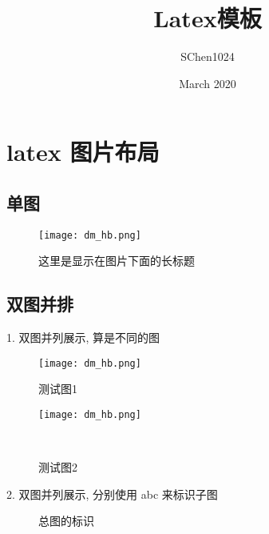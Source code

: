 \documentclass{article}
\title{Latex模板}
\author{SChen1024 }
\date{March 2020}
\begin{document}

\section{latex 图片布局}

\subsection{单图}

\begin{figure}[!htbp]
    \centering
    \texttt{[image: dm\_hb.png]}
    \caption[图片短标题,显示在目录]{这里是显示在图片下面的长标题}
    \label{fig:1}           %
\end{figure}

\subsection{双图并排}

1. 双图并列展示, 算是不同的图
\begin{figure}[!htbp]
	\begin{minipage}[t]{0.5\linewidth}
		\centering
		\texttt{[image: dm\_hb.png]}
		\caption{测试图1}
		\label{fig:1}
	\end{minipage}
	\begin{minipage}[t]{0.5\linewidth}
		\centering
		\texttt{[image: dm\_hb.png]}
		\caption{测试图2}
		\label{fig:2}
	\end{minipage} \\
\end{figure}

2. 双图并列展示, 分别使用 abc  来标识子图
\begin{figure}[!htbp]
    \centering
    \caption{总图的标识}
\end{figure}
\end{document}
